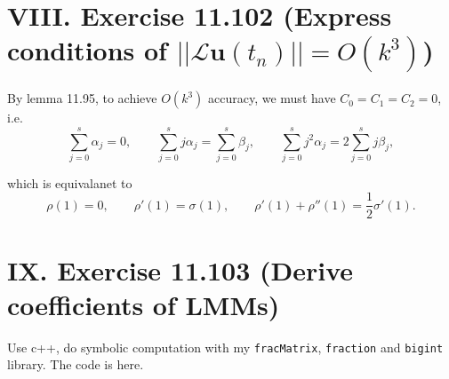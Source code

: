 \documentclass[twoside,a4paper]{article}
\begin{document}
\section*{VIII. Exercise 11.102 (Express conditions of $||\mathcal{L}\mathbf{u}(t_n)||=O(k^3)$)}

\;\;\;\; By lemma 11.95, to achieve $O(k^3)$ accuracy, we must have $C_0=C_1=C_2=0$, i.e.
\begin{equation*}
    \sum_{j=0}^s \alpha_j=0,\qquad \sum_{j=0}^s j\alpha_j=\sum_{j=0}^s \beta_j,\qquad \sum_{j=0}^sj^2\alpha_j=2\sum_{j=0}^sj\beta_j,
\end{equation*}

which is equivalanet to
\begin{equation*}
    \rho(1)=0,\qquad \rho'(1)=\sigma(1),\qquad \rho'(1)+\rho''(1)=\frac{1}{2}\sigma'(1).
\end{equation*}

\section*{IX. Exercise 11.103 (Derive coefficients of LMMs)}

\;\;\;\; Use c++, do symbolic computation with my \verb|fracMatrix|, \verb|fraction| and \verb|bigint| library. The code is here.
\end{document}
